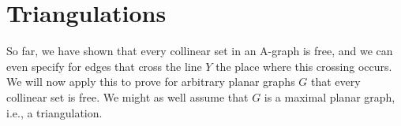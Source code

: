 \section{Triangulations}



So far, we have shown that every collinear set in an A-graph is free,
and we can even specify  for edges that cross the line $Y$ the place
where this crossing occurs.
We will now apply this to prove for arbitrary planar graphs $G$
that every collinear set is free.
We might as well assume that $G$ is a maximal planar graph, i.e., a
triangulation.





